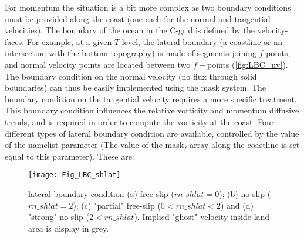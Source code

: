 \documentclass[../main/NEMO_manual]{subfiles}
\begin{document}
For momentum the situation is a bit more complex as two boundary conditions must be provided along the coast
(one each for the normal and tangential velocities).
The boundary of the ocean in the C-grid is defined by the velocity-faces.
For example, at a given $T$-level,
the lateral boundary (a coastline or an intersection with the bottom topography) is made of
segments joining $f$-points, and normal velocity points are located between two $f-$points (\autoref{fig:LBC_uv}).
The boundary condition on the normal velocity (no flux through solid boundaries)
can thus be easily implemented using the mask system.
The boundary condition on the tangential velocity requires a more specific treatment.
This boundary condition influences the relative vorticity and momentum diffusive trends,
and is required in order to compute the vorticity at the coast.
Four different types of lateral boundary condition are available,
controlled by the value of the  namelist parameter
(The value of the mask$_{f}$ array along the coastline is set equal to this parameter).
These are:

\begin{figure}[!p]
  \begin{center}
    \texttt{[image: Fig\_LBC\_shlat]}
    \caption{
      \protect\label{fig:LBC_shlat}
      lateral boundary condition
      (a) free-slip ($rn\_shlat=0$);
      (b) no-slip ($rn\_shlat=2$);
      (c) "partial" free-slip ($0<rn\_shlat<2$) and
      (d) "strong" no-slip ($2<rn\_shlat$).
      Implied "ghost" velocity inside land area is display in grey.
    }
  \end{center}
\end{figure}
\end{document}
